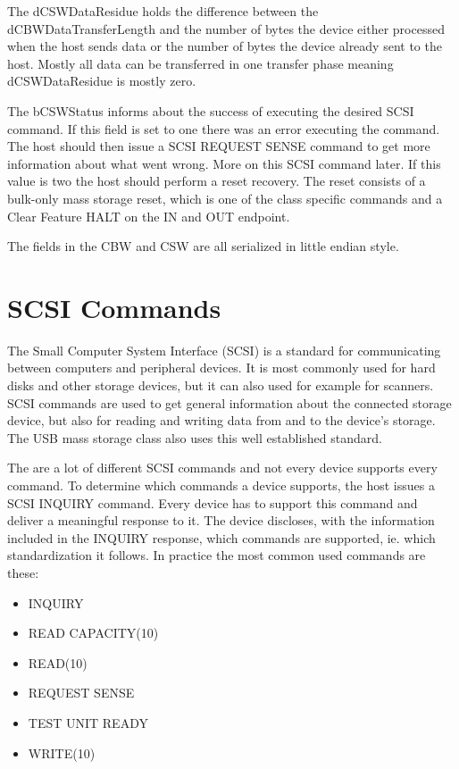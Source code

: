 The dCSWDataResidue holds the difference between the dCBWDataTransferLength and the number of bytes the device either processed when the host sends data or the number of bytes the device already sent to the host. Mostly all data can be transferred in one transfer phase meaning dCSWDataResidue is mostly zero.

The bCSWStatus informs about the success of executing the desired SCSI command. If this field is set to one there was an error executing the command. The host should then issue a SCSI REQUEST SENSE command to get more information about what went wrong\cite{usb_ms_jan}. More on this SCSI command later. If this value is two the host should perform a reset recovery. The reset consists of a bulk-only mass storage reset, which is one of the class specific commands and a Clear Feature HALT on the IN and OUT endpoint\cite{usb_ms_jan, usb_mass_bulk}.

The fields in the CBW and CSW are all serialized in little endian style.

\section{SCSI Commands}

The Small Computer System Interface (SCSI) is a standard for communicating between computers and peripheral devices. It is most commonly used for hard disks and other storage devices, but it can also used for example for scanners\cite{wiki_scsi}. SCSI commands are used to get general information about the connected storage device, but also for reading and writing data from and to the device's storage. The USB mass storage class also uses this well established standard.

The are a lot of different SCSI commands and not every device supports every command. To determine which commands a device supports, the host issues a SCSI INQUIRY command. Every device has to support this command and deliver a meaningful response to it. The device discloses, with the information included in the INQUIRY response, which commands are supported, ie. which standardization it follows. In practice the most common used commands are these\cite{usb_ms_jan}:

\begin{itemize}
\item INQUIRY
\item READ CAPACITY(10)
\item READ(10)
\item REQUEST SENSE
\item TEST UNIT READY
\item WRITE(10)
\end{itemize}

